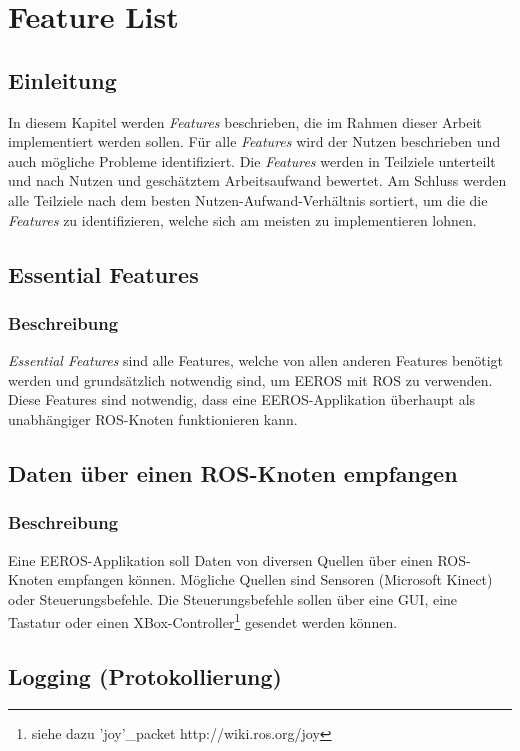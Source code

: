\chapter{Feature List}
\label{chapter:featureList}
\section{Einleitung}
In diesem Kapitel werden \textit{Features} beschrieben, die im Rahmen dieser Arbeit implementiert werden sollen.
Für alle \textit{Features} wird der Nutzen beschrieben und auch mögliche Probleme identifiziert.
Die \textit{Features} werden in Teilziele unterteilt und nach Nutzen und geschätztem Arbeitsaufwand bewertet.
Am Schluss werden alle Teilziele nach dem besten Nutzen-Aufwand-Verhältnis sortiert, um die die \textit{Features} zu identifizieren, welche sich am meisten zu implementieren lohnen.


\section{Essential Features}
\subsection{Beschreibung}
\textit{Essential Features} sind alle Features, welche von allen anderen Features benötigt werden und grundsätzlich notwendig sind, um EEROS mit ROS zu verwenden.
Diese Features sind notwendig, dass eine EEROS-Applikation überhaupt als unabhängiger ROS-Knoten funktionieren kann.


\section{Daten über einen ROS-Knoten empfangen}
\subsection{Beschreibung}
Eine EEROS-Applikation soll Daten von diversen Quellen über einen ROS-Knoten empfangen können.
Mögliche Quellen sind Sensoren (Microsoft Kinect) oder Steuerungsbefehle.
Die Steuerungsbefehle sollen über eine GUI, eine Tastatur oder einen XBox-Controller\footnote{siehe dazu 'joy'\_packet http://wiki.ros.org/joy} gesendet werden können.


\section{Logging (Protokollierung)}
